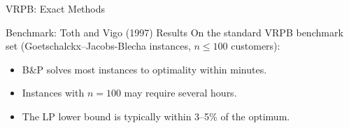 \documentclass[aspectratio=169,10pt]{beamer}
\begin{document}
\begin{frame}[allowframebreaks]{VRPB: Exact Methods}
\begin{block}{Benchmark: Toth and Vigo (1997) Results}
  On the standard VRPB benchmark set (Goetschalckx--Jacobs-Blecha instances,
  $n \leq 100$ customers):
  \begin{itemize}
    \item B\&P solves most instances to optimality within minutes.
    \item Instances with $n = 100$ may require several hours.
    \item The LP lower bound is typically within 3--5\% of the optimum.
  \end{itemize}
\end{block}

\end{frame}

\end{document}
